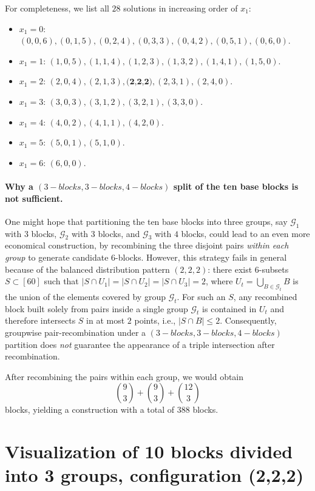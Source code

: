 \documentclass[11pt]{article}
\begin{document}
For completeness, we list all $28$ solutions in increasing order of $x_1$:

\begin{itemize}
  \item $x_1=0$: $(0,0,6),(0,1,5),(0,2,4),(0,3,3),(0,4,2),(0,5,1),(0,6,0)$.
  \item $x_1=1$: $(1,0,5),(1,1,4),(1,2,3),(1,3,2),(1,4,1),(1,5,0)$.
  \item $x_1=2$: $(2,0,4),(2,1,3),\textbf{(2,2,2)},(2,3,1),(2,4,0)$.
  \item $x_1=3$: $(3,0,3),(3,1,2),(3,2,1),(3,3,0)$.
  \item $x_1=4$: $(4,0,2),(4,1,1),(4,2,0)$.
  \item $x_1=5$: $(5,0,1),(5,1,0)$.
  \item $x_1=6$: $(6,0,0)$.
\end{itemize}

\paragraph{Why a $(3-blocks,3-blocks,4-blocks)$ split of the ten base blocks is not sufficient.}
One might hope that partitioning the ten base blocks into three groups,
say $\mathcal{G}_1$ with $3$ blocks, $\mathcal{G}_2$ with $3$ blocks, and $\mathcal{G}_3$ with $4$ blocks,
could lead to an even more economical construction, by recombining the three disjoint pairs
\emph{within each group} to generate candidate $6$-blocks.
However, this strategy fails in general because of the balanced distribution pattern $(2,2,2)$:
there exist $6$-subsets $S\subset[60]$ such that $|S\cap U_1|=|S\cap U_2|=|S\cap U_3|=2$,
where $U_t=\bigcup_{B\in\mathcal{G}_t}B$ is the union of the elements covered by group $\mathcal{G}_t$.
For such an $S$, any recombined block built solely from pairs inside a single group $\mathcal{G}_t$
is contained in $U_t$ and therefore intersects $S$ in at most $2$ points, i.e., $|S\cap B|\le 2$.
Consequently, groupwise pair-recombination under a $(3-blocks,3-blocks,4-blocks)$ partition does \emph{not} guarantee
the appearance of a triple intersection after recombination.

After recombining the pairs within each group, we would obtain
\[
\binom{9}{3}+\binom{9}{3}+\binom{12}{3}
\]
blocks, yielding a construction with a total of $388$ blocks.

\section*{Visualization of 10 blocks divided into 3 groups, configuration (2,2,2)}
\end{document}
